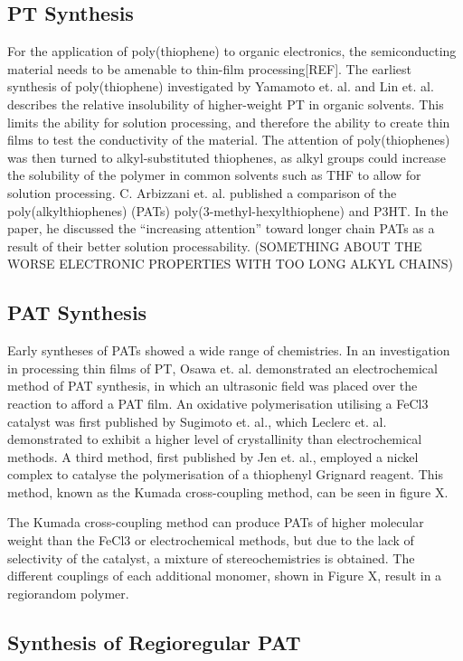 \subsection{PT Synthesis}

For the application of poly(thiophene) to organic electronics, the semiconducting material needs to be amenable to thin-film processing[REF]. The earliest synthesis of poly(thiophene) investigated by Yamamoto et. al. and Lin et. al. describes the relative insolubility of higher-weight PT in organic solvents. This limits the ability for solution processing, and therefore the ability to create thin films to test the conductivity of the material. The attention of poly(thiophenes) was then turned to alkyl-substituted thiophenes, as alkyl groups could increase the solubility of the polymer in common solvents such as THF to allow for solution processing.
C. Arbizzani et. al. published a comparison of the poly(alkylthiophenes) (PATs) poly(3-methyl-hexylthiophene) and P3HT. In the paper, he discussed the “increasing attention” toward longer chain PATs as a result of their better solution processability. (SOMETHING ABOUT THE WORSE ELECTRONIC PROPERTIES WITH TOO LONG ALKYL CHAINS)

\subsection{PAT Synthesis}

Early syntheses of PATs showed a wide range of chemistries. In an investigation in processing thin films of PT, Osawa et. al. demonstrated an electrochemical method of PAT synthesis, in which an ultrasonic field was placed over the reaction to afford a PAT film. An oxidative polymerisation utilising a FeCl3 catalyst was first published by Sugimoto et. al., which Leclerc et. al. demonstrated to exhibit a higher level of crystallinity than electrochemical methods. A third method, first published by Jen et. al., employed a nickel complex to catalyse the polymerisation of a thiophenyl Grignard reagent. This method, known as the Kumada cross-coupling method, can be seen in figure X.

The Kumada cross-coupling method can produce PATs of higher molecular weight than the FeCl3 or electrochemical methods, but due to the lack of selectivity of the catalyst, a mixture of stereochemistries is obtained. The different couplings of each additional monomer, shown in Figure X, result in a regiorandom polymer.

\subsection{Synthesis of Regioregular PAT}

